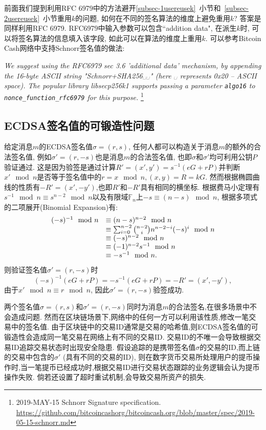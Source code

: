 \documentclass{article}
\newcommand{\F}{\mathbb{F}}
\newcommand{\code}[1]{\lstinline!#1!}
\begin{document}
前面我们提到利用RFC 6979中的方法避开\ref{subsec-1usereusek}~小节和~\ref{subsec-2usereusek}~小节重用$k$的问题,
如何在不同的签名算法的维度上避免重用$k$? 答案是同样利用RFC 6979. 
RFC6979中输入参数可以包含``addition data", 在派生$k$时, 可以将签名算法的信息填入该字段, 如此可以在算法的维度上重用$k$.
可以参考Bitcoin Cash网络中支持Schnorr签名值的做法:

\textit{
We suggest using the RFC6979 sec 3.6 'additional data' mechanism, by appending the 16-byte ASCII string "Schnorr+SHA256␣␣" (here ␣ represents 0x20 -- ASCII space). The popular library libsecp256k1 supports passing a parameter \code{algo16} to \code{nonce_function_rfc6979} for this purpose.
}\footnote{
2019-MAY-15 Schnorr Signature specification. 
\url{https://github.com/bitcoincashorg/bitcoincash.org/blob/master/spec/2019-05-15-schnorr.md}}

\subsection{ECDSA签名值的可锻造性问题\label{subsec-lowers}}

给定消息$m$的ECDSA签名值$\sigma=(r, s)$, 任何人都可以构造关于消息$m$的额外的合法签名值,
例如$\sigma'=(r, -s)$也是消息$m$的合法签名值, 也即$\sigma$和$\sigma'$均可利用公钥$P$验证通过.
这是因为验签是通过计算$R'=(x',y')=s^{-1}(eG + rP)$并判断$x' \mod n$是否等于签名值中的$r = x \mod n, (x, y) = R = kG$. 
然而根据椭圆曲线的性质有$-R' = (x', -y')$,也即$R'$和$-R'$具有相同的横坐标.
根据费马小定理有$s^{-1}\mod n \equiv s^{n-2} \mod n$以及有限域$\F_n$上$-s \equiv (n-s) \mod n$, 
根据多项式的二项展开(Binomial Expansion)有:
$$
\begin{array}{ll}
(-s)^{-1}\mod n & \equiv (n-s)^{n-2} \mod n \\
 & \equiv \sum_{i=0}^{n-2}\tbinom{n-2}{i}n^{n-2-i}(-s)^{i} \mod n \\
 & \equiv (-s)^{n-2} \mod n \\ 
 &  \equiv (-1)^{n-2}s^{-1}\mod n \\
 & \equiv -s^{-1}\mod n.
 \end{array}
$$
则验证签名值$\sigma'  = (r, -s)$时
$$
(-s)^{-1}(eG+rP) = -s^{-1}(eG + rP) = -R' = (x', -y'),
$$
由于$x' \mod n \equiv r \mod n$, 因此$\sigma'  = (r, -s)$验签成功.

两个签名值$\sigma=(r, s)$和$\sigma'  = (r, -s)$同时为消息$m$的合法签名,在很多场景中不会造成问题.
然而在区块链场景下,网络中的任何一方可以利用该性质,修改一笔交易中的签名值.
由于区块链中的交易ID通常是交易的哈希值,则ECDSA签名值的可锻造性会造成同一笔交易在网络上有不同的交易ID.
交易ID的不唯一会导致根据交易ID追踪交易状态时出现安全隐患.
假设追踪的是携带签名值$\sigma$的交易的ID,而上链的交易中包含的$\sigma'$ (具有不同的交易的ID),
则在数字货币交易所处理用户的提币操作时,当一笔提币已经成功时,根据交易ID进行交易状态跟踪的业务逻辑会认为提币操作失败.
倘若还设置了超时重试机制,会导致交易所资产的损失.
\end{document}
